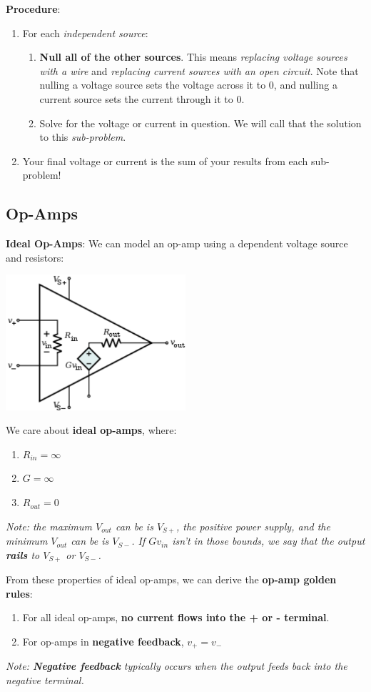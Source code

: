 \textbf{Procedure}:
\begin{enumerate}
    \item For each \textit{independent source}:
    \begin{enumerate}
        \item \textbf{Null all of the other sources}. This means \textit{replacing voltage sources with a wire} and \textit{replacing current sources with an open circuit}. Note that nulling a voltage source sets the voltage across it to 0, and nulling a current source sets the current through it to 0.
        \item Solve for the voltage or current in question. We will call that the solution to this \textit{sub-problem}.
    \end{enumerate}
    \item Your final voltage or current is the sum of your results from each sub-problem!
\end{enumerate}

\subsection*{Op-Amps}
\textbf{Ideal Op-Amps}: 
We can model an op-amp using a dependent voltage source and resistors:
\begin{center}
    \includegraphics[width=0.5\textwidth]{opamp_model.png}
\end{center}
We care about \textbf{ideal op-amps}, where:
\begin{enumerate}
    \item $R_{in} = \infty$
    \item $G = \infty$
    \item $R_{out} = 0$
\end{enumerate}
\textit{Note: the maximum $V_{out}$ can be is $V_{S+}$, the positive power supply, and the minimum $V_{out}$ can be is $V_{S-}$. If $Gv_{in}$ isn't in those bounds, we say that the output \textbf{rails} to $V_{S+}$ or $V_{S-}$.}

From these properties of ideal op-amps, we can derive the \textbf{op-amp golden rules}:
\begin{enumerate}
    \item For all ideal op-amps, \textbf{no current flows into the + or - terminal}.
    \item For op-amps in \textbf{negative feedback}, $v_+ = v_-$
\end{enumerate}
\textit{Note: \textbf{Negative feedback} typically occurs when the output feeds back into the negative terminal.}

